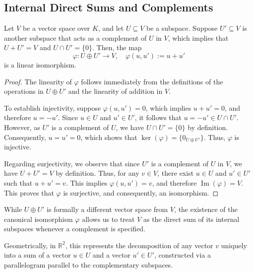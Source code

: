 \subsection{Internal Direct Sums and Complements}

\begin{proposition}
  Let $V$ be a vector space over $K$, and let $U \subseteq V$ be a subspace. Suppose $U' \subseteq V$ is another subspace that acts as a complement of $U$ in $V$, which implies that $U + U' = V$ and $U \cap U' = \{0\}$. Then, the map
  \[
  \varphi \colon U \oplus U' \to V, \quad \varphi(u, u') := u + u'
  \]
  is a linear isomorphism.
\end{proposition}

\begin{proof}
  The linearity of $\varphi$ follows immediately from the definitions of the operations in $U \oplus U'$ and the linearity of addition in $V$.

  To establish injectivity, suppose $\varphi(u, u') = 0$, which implies $u + u' = 0$, and therefore $u = -u'$. Since $u \in U$ and $u' \in U'$, it follows that $u = -u' \in U \cap U'$. However, as $U'$ is a complement of $U$, we have $U \cap U' = \{0\}$ by definition. Consequently, $u = u' = 0$, which shows that $\ker(\varphi) = \{0_{U \oplus U'}\}$. Thus, $\varphi$ is injective.

  Regarding surjectivity, we observe that since $U'$ is a complement of $U$ in $V$, we have $U + U' = V$ by definition. Thus, for any $v \in V$, there exist $u \in U$ and $u' \in U'$ such that $u + u' = v$. This implies $\varphi(u, u') = v$, and therefore $\operatorname{Im}(\varphi) = V$. This proves that $\varphi$ is surjective, and consequently, an isomorphism.
\end{proof}

\begin{remark}
  While $U \oplus U'$ is formally a different vector space from $V$, the existence of the canonical isomorphism $\varphi$ allows us to treat $V$ as the direct sum of its internal subspaces whenever a complement is specified.
\end{remark}

Geometrically, in $\mathbb{R}^2$, this represents the decomposition of any vector $v$ uniquely into a sum of a vector $u \in U$ and a vector $u' \in U'$, constructed via a parallelogram parallel to the complementary subspaces.

